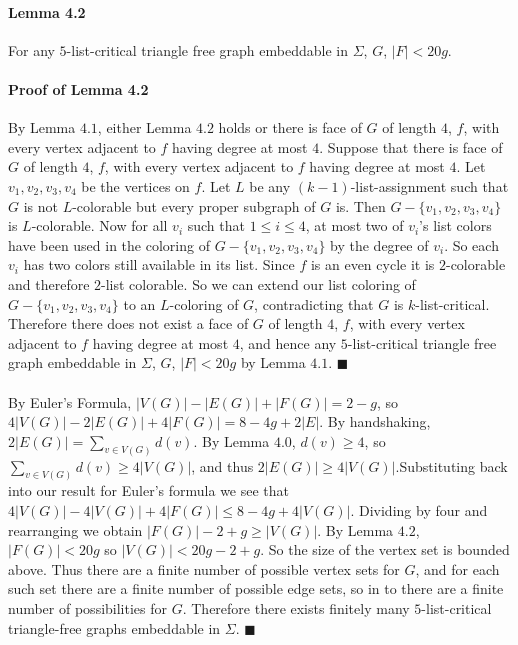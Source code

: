\documentclass[letterpaper,12pt,oneside,onecolumn]{report}
\begin{document}
\paragraph{Lemma 4.2}
For any $5$-list-critical triangle free graph embeddable in $\Sigma$, $G$, $|F| < 20g$.
\paragraph{Proof of Lemma 4.2}
By Lemma $4.1$, either Lemma $4.2$ holds or there is face of $G$ of length $4$, $f$, with every vertex adjacent to $f$ having degree at most $4$. Suppose that there is face of $G$ of length $4$, $f$, with every vertex adjacent to $f$ having degree at most $4$. Let $v_1,v_2,v_3,v_4$ be the vertices on $f$. Let $L$ be any $(k-1)$-list-assignment such that $G$ is not $L$-colorable but every proper subgraph of $G$ is. Then $G - \{v_1,v_2,v_3,v_4\}$ is $L$-colorable. Now for all $v_i$ such that $1\leq i \leq 4$, at most two of $v_i$'s list colors have been used in the coloring of $G - \{v_1,v_2,v_3,v_4\}$ by the degree of $v_i$. So each $v_i$ has two colors still available in its list. Since $f$ is an even cycle it is $2$-colorable and therefore $2$-list colorable. So we can extend our list coloring of $G- \{v_1,v_2,v_3,v_4\}$ to an $L$-coloring of $G$, contradicting that $G$ is $k$-list-critical. Therefore there does not exist a face of $G$ of length $4$, $f$, with every vertex adjacent to $f$ having degree at most $4$, and hence any $5$-list-critical triangle free graph embeddable in $\Sigma$, $G$, $|F| < 20g$ by Lemma $4.1$. $\blacksquare$
\paragraph{}
By Euler's Formula, $|V(G)| - |E(G)| + |F(G)| = 2 - g$, so $4|V(G)| - 2|E(G)| + 4|F(G)| = 8- 4g + 2|E|$. By handshaking, $2|E(G)| = \sum_{v\in V(G)} d(v)$. By Lemma $4.0$, $d(v) \geq 4$, so $\sum_{v\in V(G)} d(v) \geq 4|V(G)|$, and thus $2|E(G)| \geq 4|V(G)|$.Substituting back into our result for Euler's formula we see that $4|V(G)| -4|V(G)| + 4|F(G)| \leq 8-4g +4|V(G)|$. Dividing by four and rearranging we obtain $|F(G)| -2 + g \geq |V(G)|$. By Lemma $4.2$, $|F(G)| < 20g$ so $|V(G)| < 20g - 2 + g$. So the size of the vertex set is bounded above. Thus there are a finite number of possible vertex sets for $G$, and for each such set there are a finite number of possible edge sets, so in to there are a finite number of possibilities for $G$. Therefore there exists finitely many $5$-list-critical triangle-free graphs embeddable in $\Sigma$. $\blacksquare$
\end{document}

